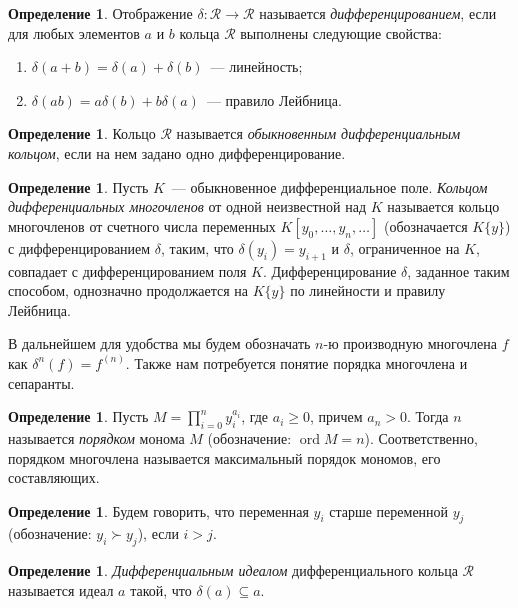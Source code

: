 \documentclass[16pt]{article}
\DeclareMathOperator{\ord}{ord}
\renewcommand{\ge}{\geqslant} %
\theoremstyle{plain1}
\theoremstyle{plain2}
\theoremstyle{plain}
\theoremstyle{plain3}
\theoremstyle{definition}
\newtheorem{definition}[theorem2]{Определение}
\theoremstyle{remark}
\begin{document}
\begin{definition}
Отображение $\delta: \mathcal{R} \to \mathcal{R}$ называется \emph{дифференцированием}, если для любых элементов $a$ и $b$ кольца $\mathcal{R}$
выполнены следующие свойства:
\begin{enumerate}
  \item $\delta(a+b)= \delta(a)+\delta(b)$~--– линейность;
  \item $\delta(ab)=a\delta(b)+b\delta(a)$~--- правило Лейбница.
\end{enumerate}
\end{definition}

\begin{definition}
Кольцо $\mathcal{R}$ называется \emph{обыкновенным дифференциальным кольцом}, если на нем задано одно дифференцирование.
\end{definition}

\begin{definition}
Пусть $K$~--- обыкновенное дифференциальное поле.
\emph{Кольцом дифференциальных многочленов} от одной неизвестной над $K$
называется кольцо многочленов от счетного числа переменных ${K}[y_0,\ldots,y_n,\ldots]$
(обозначается ${K}\{y\}$)
с дифференцированием $\delta$, таким, что $\delta(y_i)=y_{i+1}$ и $\delta$, ограниченное на ${K}$, совпадает с дифференцированием поля $K$. Дифференцирование $\delta$, заданное таким способом, однозначно продолжается на $K\{y\}$ по линейности и правилу Лейбница.
\end{definition}

В дальнейшем для удобства мы будем обозначать $n$-ю производную многочлена $f$ как $\delta^n(f)=f^{(n)}$. Также нам потребуется понятие порядка многочлена и сепаранты.
\begin{definition}
Пусть $M = \prod\limits_{i=0}^ny_i^{a_i}$, где $a_i \ge 0$, причем $a_n > 0$. Тогда $n$ называется \emph{порядком} монома $M$ (обозначение: $\ord M=n$). Соответственно, порядком многочлена называется максимальный порядок
мономов, его составляющих.
\end{definition}
\begin{definition}
Будем говорить, что переменная $y_i$ старше переменной $y_j$ (обозначение: $y_i \succ y_j$), если $i>j$.
\end{definition}
\begin{definition}
\emph{Дифференциальным идеалом} дифференциального кольца $\mathcal{R}$ называется идеал $a$ такой, что $\delta(a)\subseteq a$.
\end{definition}
\end{document}
